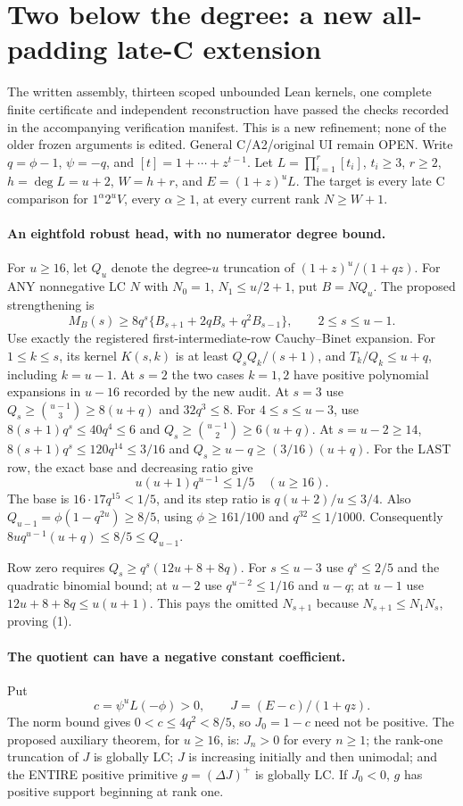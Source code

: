 \section{Two below the degree: a new all-padding late-C extension}
The written assembly, thirteen scoped unbounded Lean kernels, one
complete finite certificate and independent reconstruction have passed
the checks recorded in the accompanying verification manifest. This is
a new refinement; none of the older frozen arguments is edited.
General C/A2/original UI remain OPEN.
Write $q=\phi-1$, $\psi=-q$, and $[t]=1+\cdots+z^{t-1}$.
Let $L=\prod_{i=1}^r[t_i]$, $t_i\ge3$, $r\ge2$,
$h=\deg L=u+2$, $W=h+r$, and $E=(1+z)^uL$.
The target is every late C comparison for $1^\alpha2^uV$, every
$\alpha\ge1$, at every current rank $N\ge W+1$.

\paragraph{An eightfold robust head, with no numerator degree bound.}
For $u\ge16$, let $Q_u$ denote the degree-$u$ truncation of
$(1+z)^u/(1+qz)$. For ANY nonnegative LC $N$ with $N_0=1$,
$N_1\le u/2+1$, put $B=NQ_u$. The proposed strengthening is
\[
 M_B(s)\ge8q^s\{B_{s+1}+2qB_s+q^2B_{s-1}\},
                         \qquad 2\le s\le u-1.       \tag{1}
\]
Use exactly the registered first-intermediate-row Cauchy--Binet
expansion. For $1\le k\le s$, its kernel $K(s,k)$ is at least
$Q_sQ_k/(s+1)$, and $T_k/Q_k\le u+q$, including $k=u-1$.
At $s=2$ the two cases $k=1,2$ have positive polynomial
expansions in $u-16$ recorded by the new audit. At $s=3$ use
$Q_s\ge\binom{u-1}{3}\ge8(u+q)$ and $32q^3\le8$.
For $4\le s\le u-3$, use $8(s+1)q^s\le40q^4\le6$ and
$Q_s\ge\binom{u-1}{2}\ge6(u+q)$.
At $s=u-2\ge14$, $8(s+1)q^s\le120q^{14}\le3/16$ and
$Q_s\ge u-q\ge(3/16)(u+q)$.
For the LAST row, the exact base and decreasing ratio give
\[
       u(u+1)q^{u-1}\le1/5\quad(u\ge16).
\]
The base is $16\cdot17q^{15}<1/5$, and its step ratio is
$q(u+2)/u\le3/4$. Also $Q_{u-1}=\phi(1-q^{2u})\ge8/5$,
using $\phi\ge161/100$ and $q^{32}\le1/1000$.
Consequently $8u q^{u-1}(u+q)\le8/5\le Q_{u-1}$.

Row zero requires $Q_s\ge q^s(12u+8+8q)$. For $s\le u-3$
use $q^s\le2/5$ and the quadratic binomial bound; at $u-2$
use $q^{u-2}\le1/16$ and $u-q$; at $u-1$ use
$12u+8+8q\le u(u+1)$. This pays the omitted $N_{s+1}$
because $N_{s+1}\le N_1N_s$, proving (1).

\paragraph{The quotient can have a negative constant coefficient.}
Put
\[
 c=\psi^uL(-\phi)>0,\qquad J=(E-c)/(1+qz).
\]
The norm bound gives $0<c\le4q^2<8/5$, so $J_0=1-c$ need
not be positive. The proposed auxiliary theorem, for $u\ge16$, is:
$J_n>0$ for every $n\ge1$; the rank-one truncation of $J$ is
globally LC; $J$ is increasing initially and then unimodal;
and the ENTIRE positive primitive $g=(\Delta J)^+$ is globally LC.
If $J_0<0$, $g$ has positive support beginning at rank one.


